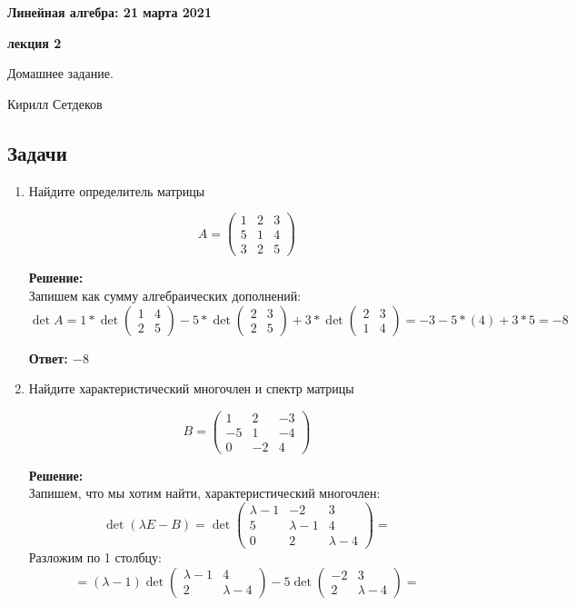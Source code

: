 \documentclass[a4paper,12pt]{article}
\newcounter{z}
\renewcommand{\date}{{\bf 21 марта 2021}}
\newcommand{\HSEhat}{
\vspace*{-0pt}
\noindent
\setcounter{z}{0}


{\bf \phantom{\date}  \large \hfill Линейная алгебра: \hfill \normalsize \date}

\vspace{5 pt}
{\bf \large \hfill  лекция 2\hfill }

\vspace{15 pt}
\centerline{ \large  Домашнее задание.}
\centerline{ \large  Кирилл Сетдеков}



\vspace*{10pt}
\setcounter{z}{0}

}
\begin{document}
\HSEhat


\subsection*{Задачи}

\begin{enumerate}

\item  Найдите определитель матрицы

$$A=
\begin{pmatrix}
1&2&3\\
5&1&4\\
3&2&5
\end{pmatrix}
$$

\vspace{5pt}
\textbf{Решение:}\\
Запишем как сумму алгебраических дополнений:
$$\det A = 1*\det \begin{pmatrix}
1&4\\
2&5
\end{pmatrix}-5*\det \begin{pmatrix}
2&3\\
2&5
\end{pmatrix}+3*\det \begin{pmatrix}
2&3\\
1&4
\end{pmatrix} = -3-5*(4)+3*5=-8$$

\textbf{Ответ: $-8$}


\item  Найдите характеристический многочлен и спектр матрицы 

$$B=
\begin{pmatrix}
1 & 2 & -3\\
-5 & 1 & -4\\
0 & -2 & 4
\end{pmatrix}
$$

\vspace{5pt}
\textbf{Решение:}\\
Запишем, что мы хотим найти, характеристический многочлен:
$$\det(\lambda E - B)= \det \begin{pmatrix}
\lambda - 1 & -2 & 3\\
5 & \lambda -1 & 4\\
0 & 2 & \lambda - 4
\end{pmatrix}=$$
Разложим по 1 столбцу:
$$=(\lambda - 1)\det\begin{pmatrix}
 \lambda -1 & 4\\
 2 & \lambda - 4
\end{pmatrix} - 5 \det \begin{pmatrix}
 -2 & 3\\
 2 & \lambda - 4
\end{pmatrix} =$$


\end{enumerate}
\end{document}
